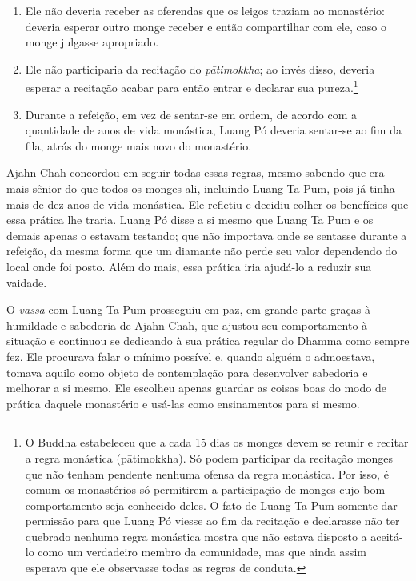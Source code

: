 \begin{enumerate}
\item
  Ele não deveria receber as oferendas que os leigos traziam ao
  monastério: deveria esperar outro monge receber e então compartilhar
  com ele, caso o monge julgasse apropriado.
\item
  Ele não participaria da recitação do \emph{pātimokkha}; ao invés
  disso, deveria esperar a recitação acabar para então entrar e declarar
  sua pureza.\footnote{O Buddha estabeleceu que a cada 15 dias os monges
    devem se reunir e recitar a regra monástica (pātimokkha). Só podem
    participar da recitação monges que não tenham pendente nenhuma
    ofensa da regra monástica. Por isso, é comum os monastérios só
    permitirem a participação de monges cujo bom comportamento seja
    conhecido deles. O fato de Luang Ta Pum somente dar permissão para
    que Luang Pó viesse ao fim da recitação e declarasse não ter
    quebrado nenhuma regra monástica mostra que não estava disposto a
    aceitá-lo como um verdadeiro membro da comunidade, mas que ainda
    assim esperava que ele observasse todas as regras de conduta.}
\item
  Durante a refeição, em vez de sentar-se em ordem, de acordo com a
  quantidade de anos de vida monástica, Luang Pó deveria sentar-se ao
  fim da fila, atrás do monge mais novo do monastério.
\end{enumerate}

Ajahn Chah concordou em seguir todas essas regras, mesmo sabendo que era
mais sênior do que todos os monges ali, incluindo Luang Ta Pum, pois já
tinha mais de dez anos de vida monástica. Ele refletiu e decidiu colher
os benefícios que essa prática lhe traria. Luang Pó disse a si mesmo que
Luang Ta Pum e os demais apenas o estavam testando; que não importava
onde se sentasse durante a refeição, da mesma forma que um diamante não
perde seu valor dependendo do local onde foi posto. Além do mais, essa
prática iria ajudá-lo a reduzir sua vaidade.

O \emph{vassa} com Luang Ta Pum prosseguiu em paz, em grande parte
graças à humildade e sabedoria de Ajahn Chah, que ajustou seu
comportamento à situação e continuou se dedicando à sua prática regular
do Dhamma como sempre fez. Ele procurava falar o mínimo possível e,
quando alguém o admoestava, tomava aquilo como objeto de contemplação
para desenvolver sabedoria e melhorar a si mesmo. Ele escolheu apenas
guardar as coisas boas do modo de prática daquele monastério e usá-las
como ensinamentos para si mesmo.

